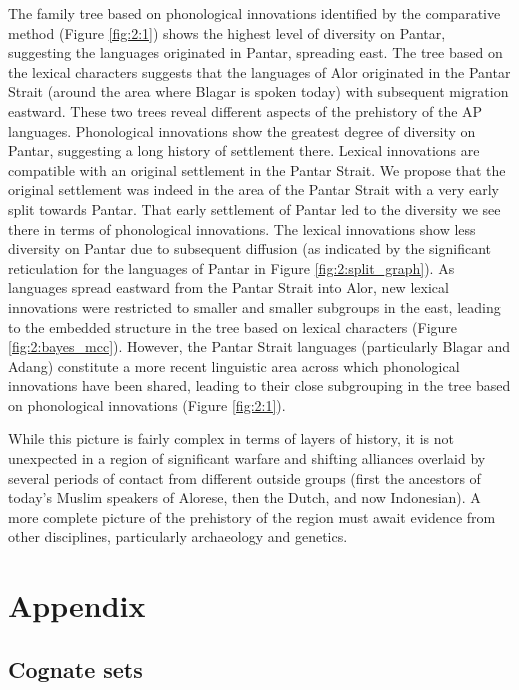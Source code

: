 The family tree based on phonological innovations identified by the comparative method (Figure \ref{fig:2:1}) shows the highest level of diversity on Pantar, suggesting the languages originated in Pantar, spreading east. The tree based on the lexical characters suggests that the languages of Alor originated in the Pantar Strait (around the area where Blagar is spoken today) with subsequent migration eastward. These two trees reveal different aspects of the prehistory of the AP languages. Phonological innovations show the greatest degree of diversity on Pantar, suggesting a long history of settlement there. Lexical innovations are compatible with an original settlement in the Pantar Strait. We propose that the original settlement was indeed in the area of the Pantar Strait with a very early split towards Pantar. That early settlement of Pantar led to the diversity we see there in terms of phonological innovations. The lexical innovations show less diversity on Pantar due to subsequent diffusion (as indicated by 
the significant reticulation for the languages of Pantar in Figure \ref{fig:2:split_graph}). As languages spread eastward from the Pantar Strait into Alor, new lexical innovations were restricted to smaller and smaller subgroups in the east, leading to the embedded structure in the tree based on lexical characters (Figure \ref{fig:2:bayes_mcc}). However, the Pantar Strait languages (particularly Blagar and Adang) constitute a more recent linguistic area across which phonological innovations have been shared, leading to their close subgrouping in the tree based on phonological innovations (Figure \ref{fig:2:1}).  

While this picture is fairly complex in terms of layers of history, it is not unexpected in a region of significant warfare and shifting alliances overlaid by several periods of contact from different outside groups (first the ancestors of today's Muslim speakers of Alorese, then the Dutch, and now Indonesian). A more complete picture of the prehistory of the region must await evidence from other disciplines, particularly archaeology and genetics. 

\section*{Appendix}

\subsection*{Cognate sets}

